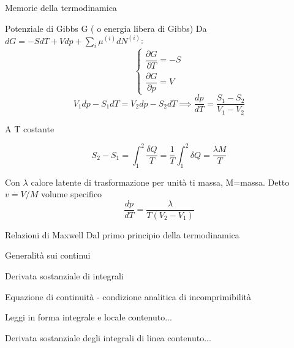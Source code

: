 \documentclass[a4paper,11pt]{report}
\newcommand{\defeq}{\overset{\cdot}{=}}
\begin{document}
\begin{chapter}{Memorie della termodinamica}
\begin{section}{Potenziale di Gibbs G ( o energia libera di Gibbs)}
		Da $dG = -SdT + Vdp + \sum_i \mu^{(i)} dN^{(i)}$:
		$$
		\left\{\begin{matrix}
		\dfrac{\partial G}{\partial T} = -S \\ 
		\dfrac{\partial G}{\partial p} = V 
		\end{matrix}\right.
		$$
		\begin{equation}
			V_1 dp -S_1 dT = V_2 dp - S_2 dT \implies \dfrac{dp}{dT} = \dfrac{S_1 - S_2}{V_1 - V_2}
		\end{equation}
		
		A T costante
		
		\begin{equation}
			S_2 - S_1 = \int_{1}^{2}\dfrac{\delta Q}{T} = \dfrac{1}{T} \int_{1}^{2} \delta Q = \dfrac{\lambda M}{T}
		\end{equation}
		
		Con $\lambda$ calore latente di trasformazione per unità ti massa, M=massa. Detto $v \defeq V/M$ volume specifico
		\begin{equation}
			\dfrac{dp}{dT} = \dfrac{\lambda}{T(V_2 - V_1)}
		\end{equation}
	\end{section}
	\begin{section}{Relazioni di Maxwell}
		Dal primo principio della termodinamica
	\end{section}
	
	\end{chapter}
	\begin{chapter}{Generalità sui continui}
		
	\end{chapter}
	\begin{chapter}{Derivata sostanziale di integrali}
		\begin{section}{Equazione di continuità - condizione analitica di incomprimibilità}
		

		\end{section}
		\begin{section}{Leggi in forma integrale e locale}
		contenuto...
		\end{section}
		\begin{section}{Derivata sostanziale degli integrali di linea}
			contenuto...
		\end{section}
	\end{chapter}
	
\end{document}
